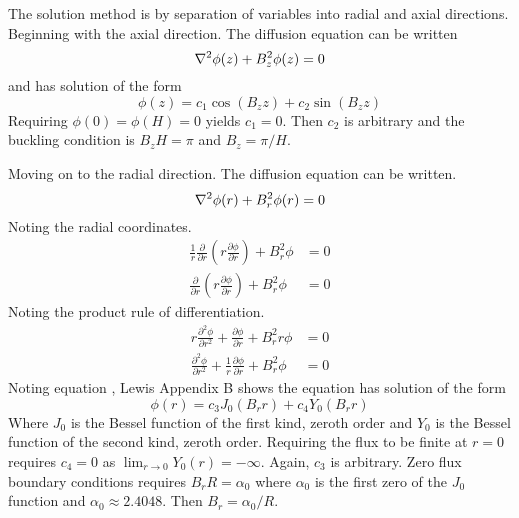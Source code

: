  The solution method is by separation of variables into radial and axial 
  directions. Beginning with the axial direction. The diffusion equation can 
  be written
  \begin{equation} \label{eq:simplediffusion}
    \mathbf{\nabla}^2 \phi(z) + B_z^2 \phi(z) = 0
  \end{equation}
  and has solution of the form
  \begin{equation} \label{eq:cyl_axial}
    \phi(z) = c_1 \cos(B_z z) + c_2 \sin(B_z z)
  \end{equation}
  Requiring $\phi(0)=\phi(H)=0$ yields $c_1=0$. Then $c_2$ is arbitrary and 
  the buckling condition is $B_zH=\pi$ and $B_z=\pi/H$.
  
  Moving on to the radial direction. The diffusion equation can be written.
  \begin{equation}
    \mathbf{\nabla}^2 \phi(r) + B_r^2 \phi(r) = 0
  \end{equation}
  Noting the radial coordinates.
  \begin{align}
    \frac{1}{r} \frac{\partial}{\partial r} \left( r \frac{\partial \phi}
      {\partial r} \right) + B_r^2 \phi &= 0 \\
    \frac{\partial}{\partial r} \left( r \frac{\partial \phi}{\partial r}
      \right) + B_r^2 \phi &= 0
  \end{align}
  Noting the product rule of differentiation.
  \begin{align}
    r \frac{\partial^2 \phi}{\partial r^2} + \frac{\partial \phi}
      {\partial r} + B_r^2 r \phi &= 0 \\
    \frac{\partial^2 \phi}{\partial r^2} + \frac{1}{r} \frac{\partial \phi}
      {\partial r} + B_r^2 \phi &= 0 \label{eq:besselequation}
  \end{align}
  Noting equation , Lewis Appendix B shows the 
  equation has solution of the form
  \begin{equation} \label{eq:cyl_radial}
    \phi(r) = c_3 J_0(B_r r) + c_4 Y_0(B_r r)
  \end{equation}
  Where $J_0$ is the Bessel function of the first kind, zeroth order and $Y_0$
  is the Bessel function of the second kind, zeroth order. Requiring the flux
  to be finite at $r=0$ requires $c_4=0$ as 
  $\lim_{r\rightarrow0} Y_0(r)=-\infty$. Again, $c_3$ is arbitrary. Zero flux 
  boundary conditions requires $B_r R=\alpha_0$ where $\alpha_0$ is the first 
  zero of the $J_0$ function and $\alpha_0 \approx 2.4048$. Then 
  $B_r=\alpha_0/R$.
  
